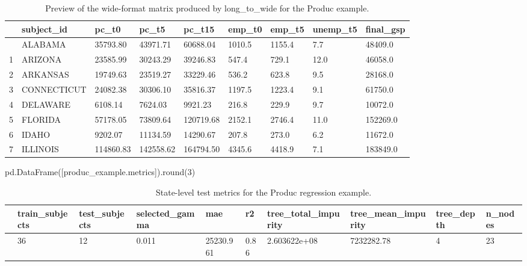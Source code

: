 \documentclass[
  letterpaper,
  DIV=11,
  numbers=noendperiod]{scrartcl}
\newenvironment{Shaded}{\begin{snugshade}}{\end{snugshade}}
\newcommand{\BuiltInTok}[1]{\textcolor[rgb]{0.00,0.23,0.31}{#1}}
\newcommand{\DecValTok}[1]{\textcolor[rgb]{0.68,0.00,0.00}{#1}}
\newcommand{\NormalTok}[1]{\textcolor[rgb]{0.00,0.23,0.31}{#1}}
\begin{document}
\begin{longtable}[]{@{}lllllllll@{}}

\caption{\label{tbl-produc-wide-preview}Preview of the wide-format
matrix produced by long\_to\_wide for the Produc example.}

\tabularnewline

\toprule\noalign{}
& subject\_id & pc\_t0 & pc\_t5 & pc\_t15 & emp\_t0 & emp\_t5 &
unemp\_t5 & final\_gsp \\
\midrule\noalign{}
\endhead
\bottomrule\noalign{}
\endlastfoot
0 & ALABAMA & 35793.80 & 43971.71 & 60688.04 & 1010.5 & 1155.4 & 7.7 &
48409.0 \\
1 & ARIZONA & 23585.99 & 30243.29 & 39246.83 & 547.4 & 729.1 & 12.0 &
46058.0 \\
2 & ARKANSAS & 19749.63 & 23519.27 & 33229.46 & 536.2 & 623.8 & 9.5 &
28168.0 \\
3 & CONNECTICUT & 24082.38 & 30306.10 & 35816.37 & 1197.5 & 1223.4 & 9.1
& 61750.0 \\
4 & DELAWARE & 6108.14 & 7624.03 & 9921.23 & 216.8 & 229.9 & 9.7 &
10072.0 \\
5 & FLORIDA & 57178.05 & 73809.64 & 120719.68 & 2152.1 & 2746.4 & 11.0 &
152269.0 \\
6 & IDAHO & 9202.07 & 11134.59 & 14290.67 & 207.8 & 273.0 & 6.2 &
11672.0 \\
7 & ILLINOIS & 114860.83 & 142558.62 & 164794.50 & 4345.6 & 4418.9 & 7.1
& 183849.0 \\

\end{longtable}

\begin{Shaded}
\begin{Highlighting}[]
\NormalTok{pd.DataFrame([produc\_example.metrics]).}\BuiltInTok{round}\NormalTok{(}\DecValTok{3}\NormalTok{)}
\end{Highlighting}
\end{Shaded}

\begin{longtable}[]{@{}llllllllll@{}}

\caption{\label{tbl-produc-metrics}State-level test metrics for the
Produc regression example.}

\tabularnewline

\toprule\noalign{}
& train\_subjects & test\_subjects & selected\_gamma & mae & r2 &
tree\_total\_impurity & tree\_mean\_impurity & tree\_depth & n\_nodes \\
\midrule\noalign{}
\endhead
\bottomrule\noalign{}
\endlastfoot
0 & 36 & 12 & 0.011 & 25230.961 & 0.86 & 2.603622e+08 & 7232282.78 & 4 &
23 \\

\end{longtable}
\end{document}
